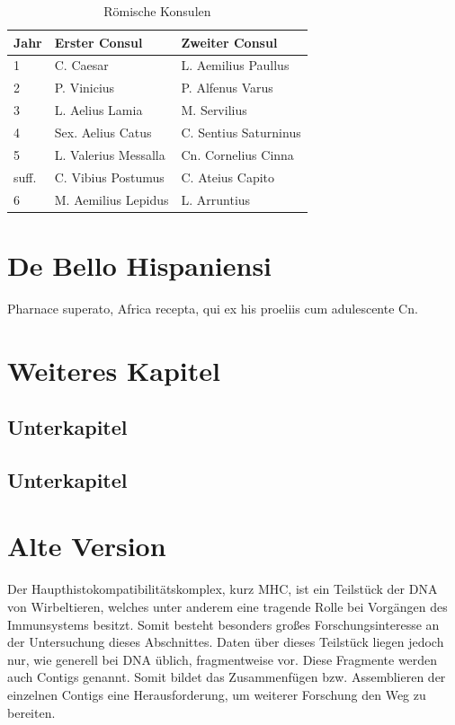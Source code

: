 \begin{table}[htb]
\begin{center}
\begin{tabular}{|l|l|l|}
\hline
Jahr &  Erster Consul & Zweiter Consul\\
\hline \hline
1 & C. Caesar         & L. Aemilius Paullus\\
2 & P. Vinicius       & P. Alfenus Varus\\
3 & L. Aelius Lamia   & M. Servilius\\
4 & Sex. Aelius Catus &  C. Sentius Saturninus\\
5 & L. Valerius Messalla& Cn. Cornelius Cinna \\
suff. & C. Vibius Postumus &  C. Ateius Capito\\
6 & M. Aemilius Lepidus & L. Arruntius\\
\hline
\end{tabular}
 \caption{Römische Konsulen}\label{tab_Konsulen}
\end{center}
\end{table}


\pagebreak

\section{De Bello Hispaniensi}\raggedbottom 

Pharnace superato, Africa recepta, qui ex his proeliis cum
adulescente Cn. 

\pagebreak
\section{Weiteres Kapitel}\raggedbottom 
\subsection{Unterkapitel}
\subsection{Unterkapitel}


\section{Alte Version} \raggedbottom 

Der Haupthistokompatibilitätskomplex, kurz MHC, ist ein Teilstück der DNA von Wirbeltieren, welches unter anderem eine tragende Rolle bei Vorgängen des Immunsystems besitzt. Somit besteht besonders großes Forschungsinteresse an der Untersuchung dieses Abschnittes. Daten über dieses Teilstück liegen jedoch nur, wie generell bei DNA üblich, fragmentweise vor. Diese Fragmente werden auch Contigs genannt. Somit bildet das Zusammenfügen bzw. Assemblieren der einzelnen Contigs eine Herausforderung, um weiterer Forschung den Weg zu bereiten. 


